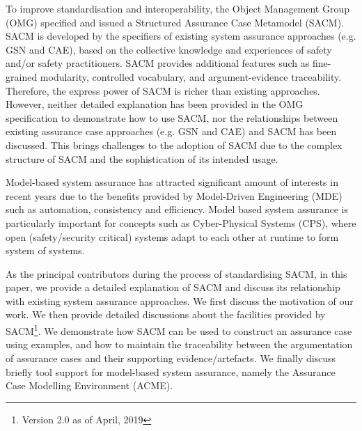 To improve standardisation and interoperability, the Object Management Group (OMG) specified and issued a Structured Assurance Case Metamodel (SACM). 
SACM is developed by the specifiers of existing system assurance approaches (e.g. GSN and CAE), based on the collective knowledge and experiences of safety and/or safety practitioners.
SACM provides additional features such as fine-grained modularity, controlled vocabulary, and argument-evidence traceability. 
Therefore, the express power of SACM is richer than existing approaches. 
However, neither detailed explanation has been provided in the OMG specification to demonstrate how to use SACM, nor the relationships between existing assurance case approaches (e.g. GSN and CAE) and SACM has been discussed. 
This brings challenges to the adoption of SACM due to the complex structure of SACM and the sophistication of its intended usage. 

Model-based system assurance has attracted significant amount of interests in recent years due to the benefits provided by Model-Driven Engineering (MDE) such as automation, consistency and efficiency. 
Model based system assurance is particularly important for concepts such as Cyber-Physical Systems (CPS), where open (safety/security critical) systems adapt to each other at runtime to form system of systems. 


As the principal contributors during the process of standardising SACM, in this paper, we provide a detailed explanation of SACM and discuss its relationship with existing system assurance approaches. 
We first discuss the motivation of our work. 
We then provide detailed discussions about the facilities provided by SACM\footnote{Version 2.0 as of April, 2019}. 
We demonstrate how SACM can be used to construct an assurance case using examples, and how to maintain the traceability between the argumentation of assurance cases and their supporting evidence/artefacts. 
We finally discuss briefly tool support for model-based system assurance, namely the Assurance Case Modelling Environment (ACME).

